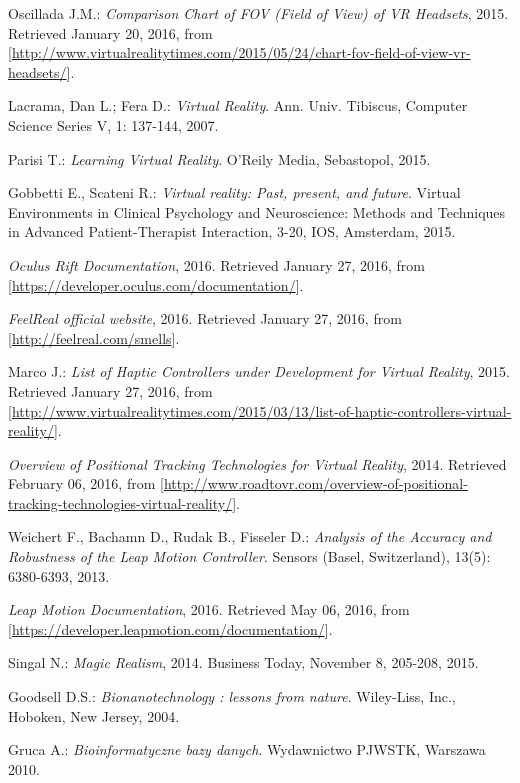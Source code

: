 \begin{thebibliography}{99}
 Oscillada J.M.: \emph{Comparison Chart of FOV (Field of View) of VR Headsets}, 2015. Retrieved January 20, 2016, from [\url{http://www.virtualrealitytimes.com/2015/05/24/chart-fov-field-of-view-vr-headsets/}].

 Lacrama, Dan L.; Fera D.: \emph{Virtual Reality}. Ann. Univ. Tibiscus, Computer Science Series V, 1: 137-144, 2007.

 Parisi T.: \emph{Learning Virtual Reality}. O'Reily Media, Sebastopol, 2015.

 Gobbetti E., Scateni R.: \emph{Virtual reality: Past, present, and future}. Virtual Environments in Clinical Psychology and Neuroscience: Methods and Techniques in Advanced Patient-Therapist Interaction, 3-20, IOS, Amsterdam, 2015.

 \emph{Oculus Rift Documentation}, 2016. Retrieved January 27, 2016, from [\url{https://developer.oculus.com/documentation/}].

 \emph{FeelReal official website}, 2016. Retrieved January 27, 2016, from [\url{http://feelreal.com/smells}].

 Marco J.: \emph{List of Haptic Controllers under Development for Virtual Reality}, 2015. Retrieved January 27, 2016, from [\url{http://www.virtualrealitytimes.com/2015/03/13/list-of-haptic-controllers-virtual-reality/}].

 \emph{Overview of Positional Tracking Technologies for Virtual Reality}, 2014. Retrieved February 06, 2016, from [\url{http://www.roadtovr.com/overview-of-positional-tracking-technologies-virtual-reality/}].

 Weichert F., Bachamn D., Rudak B., Fisseler D.: \emph{Analysis of the Accuracy and Robustness of the Leap Motion Controller}. Sensors (Basel, Switzerland), 13(5): 6380-6393, 2013.

 \emph{Leap Motion Documentation}, 2016. Retrieved May 06, 2016, from [\url{https://developer.leapmotion.com/documentation/}].

 Singal N.: \emph{Magic Realism}, 2014. Business Today, November 8, 205-208, 2015.

 Goodsell D.S.: \emph{Bionanotechnology : lessons from nature}. Wiley-Liss, Inc., Hoboken, New Jersey, 2004. 

 Gruca A.: \emph{Bioinformatyczne bazy danych}. Wydawnictwo PJWSTK, Warszawa 2010. 


\end{thebibliography}
